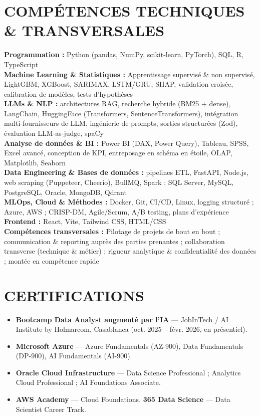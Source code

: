 \documentclass[10pt,a4paper]{article}
\begin{document}
\section*{COMPÉTENCES TECHNIQUES \& TRANSVERSALES}
\textbf{Programmation :} Python (pandas, NumPy, scikit-learn, PyTorch), SQL, R, TypeScript \\
\textbf{Machine Learning \& Statistiques :} Apprentissage supervisé \& non supervisé, LightGBM, XGBoost, SARIMAX, LSTM/GRU, SHAP, validation croisée, calibration de modèles, tests d'hypothèses \\
\textbf{LLMs \& NLP :} architectures RAG, recherche hybride (BM25 + dense), LangChain, HuggingFace (Transformers, SentenceTransformers), intégration multi-fournisseurs de LLM, ingénierie de prompts, sorties structurées (Zod), évaluation LLM-as-judge, spaCy \\
\textbf{Analyse de données \& BI :} Power BI (DAX, Power Query), Tableau, SPSS, Excel avancé, conception de KPI, entreposage en schéma en étoile, OLAP, Matplotlib, Seaborn \\
\textbf{Data Engineering \& Bases de données :} pipelines ETL, FastAPI, Node.js, web scraping (Puppeteer, Cheerio), BullMQ, Spark ; SQL Server, MySQL, PostgreSQL, Oracle, MongoDB, Qdrant \\
\textbf{MLOps, Cloud \& Méthodes :} Docker, Git, CI/CD, Linux, logging structuré ; Azure, AWS ; CRISP-DM, Agile/Scrum, A/B testing, plans d'expérience \\
\textbf{Frontend :} React, Vite, Tailwind CSS, HTML/CSS \\
\textbf{Compétences transversales :} Pilotage de projets de bout en bout ; communication \& reporting auprès des parties prenantes ; collaboration transverse (technique \& métier) ; rigueur analytique \& confidentialité des données ; montée en compétence rapide

\section*{CERTIFICATIONS}
\small
\begin{itemize}
    \item \textbf{Bootcamp Data Analyst augmenté par l'IA} — JobInTech / AI Institute by Holmarcom, Casablanca {\footnotesize(oct. 2025 – févr. 2026, en présentiel)}.
    \item \textbf{Microsoft Azure} — Azure Fundamentals (AZ-900), Data Fundamentals (DP-900), AI Fundamentals (AI-900).
    \item \textbf{Oracle Cloud Infrastructure} — Data Science Professional ; Analytics Cloud Professional ; AI Foundations Associate.
    \item \textbf{AWS Academy} — Cloud Foundations. \quad \textbf{365 Data Science} — Data Scientist Career Track.
\end{itemize}
\end{document}
